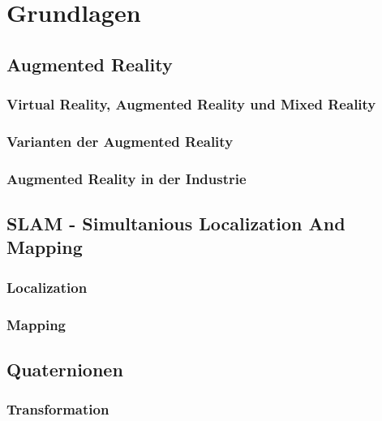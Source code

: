
\chapter{Grundlagen}
\label{chap:Grundlagen}

\section{Augmented Reality}
\label{chap:Augmented Reality}

\subsection{Virtual Reality, Augmented Reality und Mixed Reality}
\subsection{Varianten der Augmented Reality}
\subsection{Augmented Reality in der Industrie}

\section{SLAM - Simultanious Localization And Mapping}
\label{chap:SLAM}
\subsection{Localization}
\subsection{Mapping}

\section{Quaternionen}
\label{chap:Quaternionen}
\subsection{Transformation}
